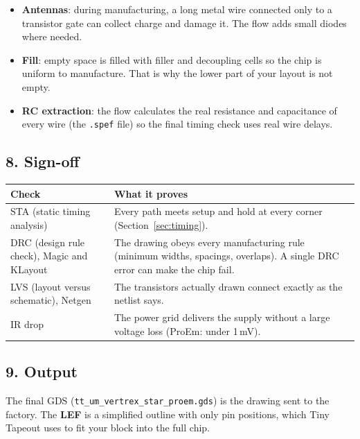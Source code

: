 \documentclass[11pt,a4paper]{article}
\newcommand{\file}[1]{\texttt{#1}}
\begin{document}
\begin{itemize}
\item \textbf{Antennas}: during manufacturing, a long metal wire connected only to a transistor gate can collect charge and damage it. The flow adds small diodes where needed.
\item \textbf{Fill}: empty space is filled with filler and decoupling cells so the chip is uniform to manufacture. That is why the lower part of your layout is not empty.
\item \textbf{RC extraction}: the flow calculates the real resistance and capacitance of every wire (the \file{.spef} file) so the final timing check uses real wire delays.
\end{itemize}

\subsection{8. Sign-off}

\begin{center}
\begin{tabularx}{\linewidth}{@{}lX@{}}
\toprule
Check & What it proves \\
\midrule
STA (static timing analysis) & Every path meets setup and hold at every corner (Section~\ref{sec:timing}). \\
DRC (design rule check), Magic and KLayout & The drawing obeys every manufacturing rule (minimum widths, spacings, overlaps). A single DRC error can make the chip fail. \\
LVS (layout versus schematic), Netgen & The transistors actually drawn connect exactly as the netlist says. \\
IR drop & The power grid delivers the supply without a large voltage loss (ProEm: under 1\,mV). \\
\bottomrule
\end{tabularx}
\end{center}

\subsection{9. Output}

The final GDS (\file{tt\_um\_vertrex\_star\_proem.gds}) is the drawing sent to the factory. The \textbf{LEF} is a simplified outline with only pin positions, which Tiny Tapeout uses to fit your block into the full chip.

\end{document}
